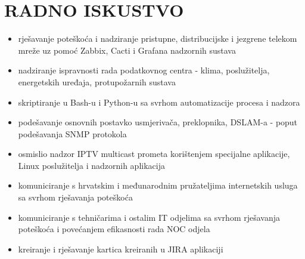 \documentclass{cv}
\begin{document}
\section{RADNO ISKUSTVO}
\begin{itemize}
    \setlength\itemsep{0.1cm}
    \item rješavanje poteškoća i nadziranje pristupne, distribucijske i jezgrene telekom mreže uz pomoć Zabbix, Cacti i Grafana nadzornih sustava
    \item nadziranje ispravnosti rada podatkovnog centra - klima, poslužitelja, energetskih uređaja, protupožarnih sustava
    \item skriptiranje u Bash-u i Python-u sa svrhom automatizacije procesa i nadzora
    \item podešavanje osnovnih postavko usmjerivača, preklopnika, DSLAM-a - poput podešavanja SNMP protokola
    \item osmislio nadzor IPTV multicast prometa korištenjem specijalne aplikacije, Linux poslužitelja i nadzornih aplikacija
    \item komuniciranje s hrvatskim i međunarodnim pružateljima internetskih usluga sa svrhom rješavanja poteškoća
    \item komuniciranje s tehničarima i ostalim IT odjelima sa svrhom rješavanja poteškoća i povećanjem efikasnosti rada NOC odjela
    \item kreiranje i rješavanje kartica kreiranih u JIRA aplikaciji
\end{itemize}
\end{document}
